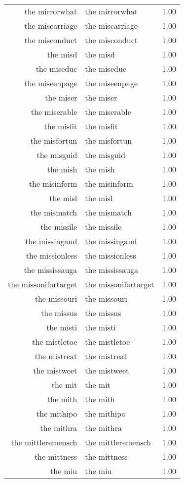 \begin{table}[ht]
\begin{tabular}{rlr}
  the mirrorwhat & the mirrorwhat & 1.00 \\ 
  the miscarriage & the miscarriage & 1.00 \\ 
  the misconduct & the misconduct & 1.00 \\ 
  the misd & the misd & 1.00 \\ 
  the miseduc & the miseduc & 1.00 \\ 
  the miseenpage & the miseenpage & 1.00 \\ 
  the miser & the miser & 1.00 \\ 
  the miserable & the miserable & 1.00 \\ 
  the misfit & the misfit & 1.00 \\ 
  the misfortun & the misfortun & 1.00 \\ 
  the misguid & the misguid & 1.00 \\ 
  the mish & the mish & 1.00 \\ 
  the misinform & the misinform & 1.00 \\ 
  the misl & the misl & 1.00 \\ 
  the mismatch & the mismatch & 1.00 \\ 
  the missile & the missile & 1.00 \\ 
  the missingand & the missingand & 1.00 \\ 
  the missionless & the missionless & 1.00 \\ 
  the mississauga & the mississauga & 1.00 \\ 
  the missonifortarget & the missonifortarget & 1.00 \\ 
  the missouri & the missouri & 1.00 \\ 
  the missus & the missus & 1.00 \\ 
  the misti & the misti & 1.00 \\ 
  the mistletoe & the mistletoe & 1.00 \\ 
  the mistreat & the mistreat & 1.00 \\ 
  the mistweet & the mistweet & 1.00 \\ 
  the mit & the mit & 1.00 \\ 
  the mith & the mith & 1.00 \\ 
  the mithipo & the mithipo & 1.00 \\ 
  the mithra & the mithra & 1.00 \\ 
  the mittleremensch & the mittleremensch & 1.00 \\ 
  the mittness & the mittness & 1.00 \\ 
  the miu & the miu & 1.00 \\ 

\end{tabular}
\end{table}
